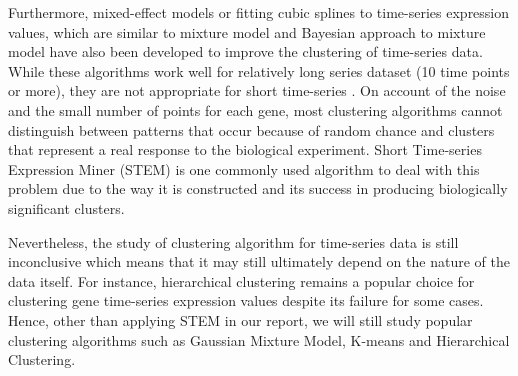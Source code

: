 Furthermore, mixed-effect models or fitting cubic splines \cite{Ma2006, Golumbeanu2017, Zhang2014} to time-series expression values, which are similar to mixture model and Bayesian approach to mixture model \cite{Jia2008} have also been developed to improve the clustering of time-series data. While these algorithms work well for relatively long series dataset (10 time points or more), they are not appropriate for short time-series \cite{Ernst2005}. On account of the noise and the small number of points for each gene, most clustering algorithms cannot distinguish between patterns that occur because of random chance and clusters that represent a real response to the biological experiment. Short Time-series Expression Miner (STEM) \cite{Ernst2005} is one commonly used algorithm to deal with this problem due to the way it is constructed and its success in producing biologically significant clusters.

Nevertheless, the study of clustering algorithm for time-series data is still inconclusive which means that it may still ultimately depend on the nature of the data itself. For instance, hierarchical clustering remains a popular choice for clustering gene time-series expression values despite its failure for some cases. Hence, other than applying STEM in our report, we will still study popular clustering algorithms such as Gaussian Mixture Model, K-means and Hierarchical Clustering.